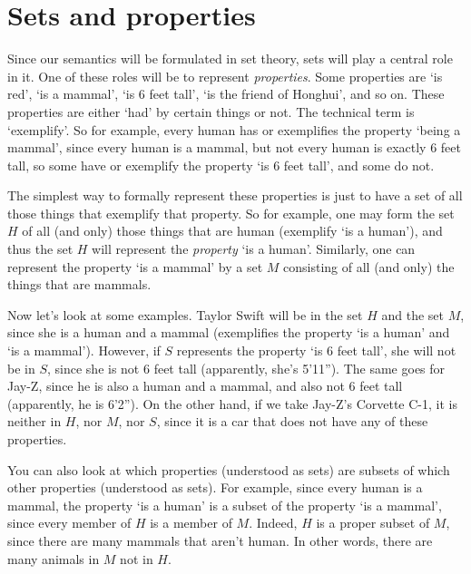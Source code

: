 \section{Sets and properties}

Since our semantics will be formulated in set theory, sets will play a central role in it. One of these roles will be to represent \textit{properties}. Some properties are `is red', `is a mammal', `is 6 feet tall', `is the friend of Honghui', and so on. These properties are either `had' by certain things or not. The technical term is `exemplify'. So for example, every human has or exemplifies the property `being a mammal', since every human is a mammal, but not every human is exactly 6 feet tall, so some have or exemplify the property `is 6 feet tall', and some do not. 

The simplest way to formally represent these properties is just to have a set of all those things that exemplify that property. So for example, one may form the set $H$ of all (and only) those things that are human (exemplify `is a human'), and thus the set $H$ will represent the \textit{property} `is a human'. Similarly, one can represent the property `is a mammal' by a set $M$ consisting of all (and only) the things that are mammals. 

Now let's look at some examples. Taylor Swift will be in the set $H$ and the set $M$, since she is a human and a mammal (exemplifies the property `is a human' and `is a mammal'). However, if $S$ represents the property `is 6 feet tall', she will not be in $S$, since she is not 6 feet tall (apparently, she's 5'11''). The same goes for Jay-Z, since he is also a human and a mammal, and also not 6 feet tall (apparently, he is 6'2''). On the other hand, if we take Jay-Z's Corvette C-1, it is neither in $H$, nor $M$, nor $S$, since it is a car that does not have any of these properties. 

You can also look at which properties (understood as sets) are subsets of which other properties (understood as sets). For example, since every human is a mammal, the property `is a human' is a subset of the property `is a mammal', since every member of $H$ is a member of $M$. Indeed, $H$ is a proper subset of $M$, since there are many mammals that aren't human. In other words, there are many animals in $M$ not in $H$. 



